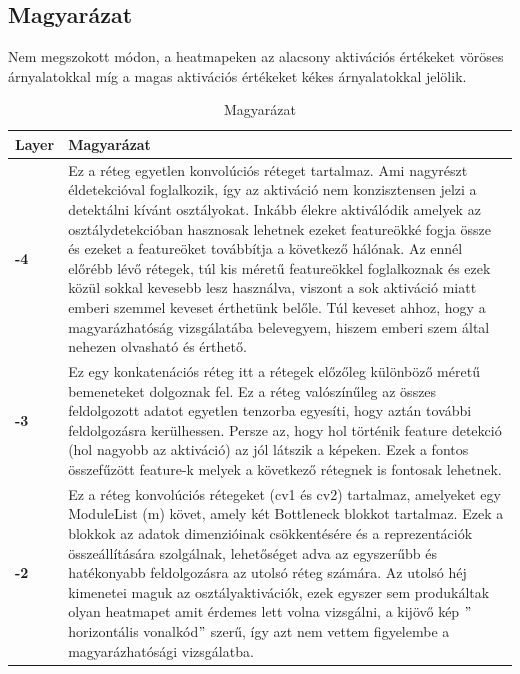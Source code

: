 \documentclass[12pt,oneside,a4paper]{article}
\theoremstyle{remark}
\begin{document}
\subsection{Magyarázat}\label{subsec:magyarazat}
Nem megszokott módon, a heatmapeken az alacsony aktivációs értékeket vöröses árnyalatokkal míg a magas aktivációs értékeket
kékes árnyalatokkal jelölik.

\begin{table}[ht]
    \center
    \begin{tabularx}{\textwidth}{|p{}||X|}
        \hline
        \textbf{Layer} & Magyarázat     \\
        \hline
        \textbf{-4}    & Ez a réteg egyetlen konvolúciós réteget tartalmaz.
        Ami nagyrészt éldetekcióval foglalkozik, így az aktiváció nem konzisztensen jelzi a detektálni kívánt osztályokat.
        Inkább élekre aktiválódik amelyek az osztálydetekcióban hasznosak lehetnek ezeket \gls{feature}ökké fogja
        össze és ezeket a \gls{feature}öket továbbítja a következő hálónak.
        Az ennél előrébb lévő rétegek, túl kis méretű \gls{feature}ökkel foglalkoznak és ezek közül sokkal kevesebb lesz használva,
        viszont a sok aktiváció miatt emberi szemmel keveset érthetünk belőle.
        Túl keveset ahhoz, hogy a magyarázhatóság vizsgálatába belevegyem, hiszem emberi szem által nehezen olvasható és érthető.\\
        \hline
        \textbf{-3}    & Ez egy konkatenációs réteg itt a rétegek előzőleg különböző méretű bemeneteket dolgoznak fel.
        Ez a réteg valószínűleg az összes feldolgozott adatot egyetlen tenzorba egyesíti, hogy aztán további
        feldolgozásra kerülhessen.
        Persze az, hogy hol történik \gls{feature} detekció (hol nagyobb az aktiváció) az jól látszik a képeken.
        Ezek a fontos összefűzött \gls{feature}-k
        melyek a következő rétegnek is fontosak lehetnek.\\
        \hline
        \textbf{-2}    &  Ez a réteg konvolúciós rétegeket (cv1 és cv2) tartalmaz, amelyeket egy ModuleList (m) követ,
        amely két Bottleneck blokkot tartalmaz.
        Ezek a blokkok az adatok dimenzióinak csökkentésére és a reprezentációk összeállítására szolgálnak,
        lehetőséget adva az egyszerűbb és hatékonyabb feldolgozásra az utolsó réteg számára.
        Az utolsó héj kimenetei maguk az osztályaktivációk, ezek egyszer sem produkáltak olyan heatmapet amit
        érdemes lett volna vizsgálni, a kijövő kép \("\)horizontális vonalkód\("\) szerű, így azt nem vettem figyelembe a
        magyarázhatósági vizsgálatba.\\
        \hline
    \end{tabularx}
    \caption{Magyarázat}\label{tab:debrief}
\end{table}
\end{document}
